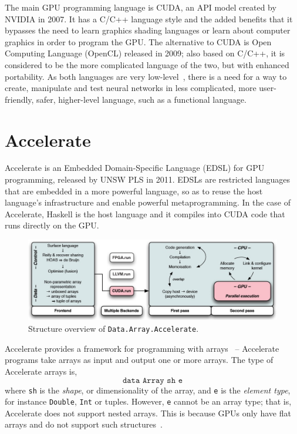 The main GPU programming language is CUDA, an API model created by NVIDIA in 2007. It has a C/C++ language style and the added benefits that it bypasses the need to learn graphics shading languages or learn about computer graphics in order to program the GPU. The alternative to CUDA is Open Computing Language (OpenCL) released in 2009; also based on C/C++, it is considered to be the more complicated language of the two, but with enhanced portability. As both languages are very low-level~\cite{Mar13}, there is a need for a way to create, manipulate and test neural networks in less complicated, more user-friendly, safer, higher-level language, such as a functional language.

\section{Accelerate}\label{se:accelerate}

Accelerate is an Embedded Domain-Specific Language (EDSL) for GPU programming, released by UNSW PLS in 2011. EDSLs are restricted languages that are embedded in a more powerful language, so as to reuse the host language's infrastructure and enable powerful metaprogramming. In the case of Accelerate, Haskell is the host language and it compiles into CUDA code that runs directly on the GPU. 

\begin{figure}
  \includegraphics[width=\linewidth]{accelerate-structure.jpg}
  \caption{Structure overview of \texttt{Data.Array.Accelerate}.~\cite{ChaKelLee11}}
  \label{fig:acc-struct}
\end{figure}

Accelerate provides a framework for programming with arrays~\cite{Mar13} -- Accelerate programs take arrays as input and output one or more arrays. The type of Accelerate arrays is,
$$\texttt{data Array sh e}$$
where \texttt{sh} is the \textit{shape}, or dimensionality of the array, and \texttt{e} is the \textit{element type}, for instance \texttt{Double}, \texttt{Int} or tuples. However, \texttt{e} cannot be an array type; that is, Accelerate does not support nested arrays. This is because GPUs only have flat arrays and do not support such structures~\cite{Mar13}. 

